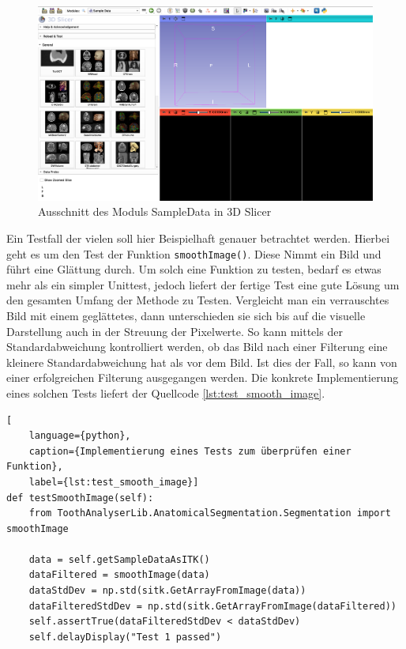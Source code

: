 \begin{figure}[h]
	\centering
	\includegraphics[width=1\textwidth]{img/sampleData.png}
	\caption{Ausschnitt des Moduls SampleData in 3D Slicer}
	\label{fig:sample_data}
\end{figure}

Ein Testfall der vielen soll hier Beispielhaft genauer betrachtet werden. Hierbei
geht es um den Test der Funktion \texttt{smoothImage()}. Diese Nimmt ein Bild und
führt eine Glättung durch. Um solch eine Funktion zu testen, bedarf es etwas mehr
als ein simpler Unittest, jedoch liefert der fertige Test eine gute Lösung um
den gesamten Umfang der Methode zu Testen. Vergleicht man ein verrauschtes Bild mit
einem geglättetes, dann unterschieden sie sich bis auf die visuelle Darstellung
auch in der Streuung der Pixelwerte. So kann mittels der Standardabweichung kontrolliert
werden, ob das Bild nach einer Filterung eine kleinere Standardabweichung hat
als vor dem Bild. Ist dies der Fall, so kann von einer erfolgreichen Filterung
ausgegangen werden. Die konkrete Implementierung eines solchen Tests liefert der
Quellcode \ref{lst:test_smooth_image}.

\begin{lstlisting}[
    language={python},
    caption={Implementierung eines Tests zum überprüfen einer Funktion},
    label={lst:test_smooth_image}]
def testSmoothImage(self):
    from ToothAnalyserLib.AnatomicalSegmentation.Segmentation import smoothImage
   
    data = self.getSampleDataAsITK()
    dataFiltered = smoothImage(data)
    dataStdDev = np.std(sitk.GetArrayFromImage(data))
    dataFilteredStdDev = np.std(sitk.GetArrayFromImage(dataFiltered))
    self.assertTrue(dataFilteredStdDev < dataStdDev)
    self.delayDisplay("Test 1 passed")
\end{lstlisting}

